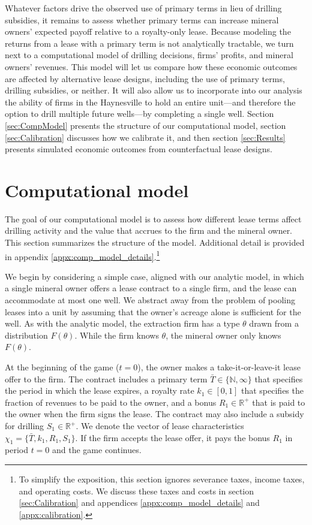 \documentclass[12pt]{article}
\begin{document}
Whatever factors drive the observed use of primary terms in lieu of drilling subsidies, it remains to assess whether primary terms can increase mineral owners' expected payoff relative to a royalty-only lease. Because modeling the returns from a lease with a primary term is not analytically tractable, we turn next to a computational model of drilling decisions, firms' profits, and mineral owners' revenues. This model will let us compare how these economic outcomes are affected by alternative lease designs, including the use of primary terms, drilling subsidies, or neither. It will also allow us to incorporate into our analysis the ability of firms in the Haynesville to hold an entire unit---and therefore the option to drill multiple future wells---by completing a single well. Section \ref{sec:CompModel} presents the structure of our computational model, section \ref{sec:Calibration} discusses how we calibrate it, and then section \ref{sec:Results} presents simulated economic outcomes from counterfactual lease designs.


\section{Computational model \label{sec:CompModel}}

The goal of our computational model is to assess how different lease terms affect drilling activity and the value that accrues to the firm and the mineral owner. This section summarizes the structure of the model. Additional detail is provided in appendix \ref{appx:comp_model_details}.\footnote{To simplify the exposition, this section ignores severance taxes, income taxes, and operating costs. We discuss these taxes and costs in section \ref{sec:Calibration} and appendices \ref{appx:comp_model_details} and \ref{appx:calibration}.} 

We begin by considering a simple case, aligned with our analytic model, in which a single mineral owner offers a lease contract to a single firm, and the lease can accommodate at most one well. We abstract away from the problem of pooling leases into a unit by assuming that the owner's acreage alone is sufficient for the well. As with the analytic model, the extraction firm has a type $\theta$ drawn from a distribution $F(\theta)$. While the firm knows $\theta$, the mineral owner only knows $F(\theta)$. 

At the beginning of the game ($t=0$), the owner makes a take-it-or-leave-it lease offer to the firm. The contract includes a primary term $\bar{T} \in \{\mathbb{N}, \infty\} $ that specifies the period in which the lease expires, a royalty rate $k_1 \in [0, 1]$ that specifies the fraction of revenues to be paid to the owner, and a bonus $R_1 \in \mathbb{R}^+$ that is paid to the owner when the firm signs the lease. The contract may also include a subsidy for drilling $S_1 \in \mathbb{R}^+$. We denote the vector of lease characteristics $\chi_1 = \{ \bar{T}, k_1, R_1, S_1 \}$. If the firm accepts the lease offer, it pays the bonus $R_1$ in period $t=0$ and the game continues.
\end{document}
